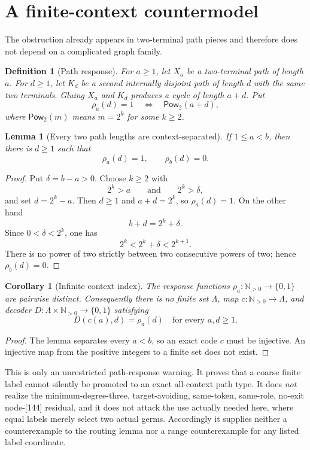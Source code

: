 \documentclass[11pt]{article}
\newtheorem{definition}{Definition}
\newtheorem{lemma}{Lemma}
\newtheorem{corollary}{Corollary}
\newcommand{\Pow}{\mathsf{Pow}_2}
\begin{document}
\section{A finite-context countermodel}

The obstruction already appears in two-terminal path pieces and therefore
does not depend on a complicated graph family.

\begin{definition}[Path response]
For $a\ge1$, let $X_a$ be a two-terminal path of length $a$.  For $d\ge1$,
let $K_d$ be a second internally disjoint path of length $d$ with the same
two terminals.  Gluing $X_a$ and $K_d$ produces a cycle of length $a+d$.
Put
\[
 \rho_a(d)=1
 \quad\Longleftrightarrow\quad
 \Pow(a+d),
\]
where $\Pow(m)$ means $m=2^k$ for some $k\ge2$.
\end{definition}

\begin{lemma}[Every two path lengths are context-separated]
If $1\le a<b$, then there is $d\ge1$ such that
\[
 \rho_a(d)=1,\qquad \rho_b(d)=0.
\]
\end{lemma}

\begin{proof}
Put $\delta=b-a>0$.  Choose $k\ge2$ with
\[
 2^k>a\qquad\text{and}\qquad 2^k>\delta,
\]
and set $d=2^k-a$.  Then $d\ge1$ and $a+d=2^k$, so
$\rho_a(d)=1$.  On the other hand
\[
 b+d=2^k+\delta.
\]
Since $0<\delta<2^k$, one has
\[
 2^k<2^k+\delta<2^{k+1}.
\]
There is no power of two strictly between two consecutive powers of two;
hence $\rho_b(d)=0$.
\end{proof}

\begin{corollary}[Infinite context index]
The response functions $\rho_a:\mathbb N_{>0}\to\{0,1\}$ are pairwise
distinct.  Consequently there is no finite set $\Lambda$, map
$c:\mathbb N_{>0}\to\Lambda$, and decoder
$D:\Lambda\times\mathbb N_{>0}\to\{0,1\}$ satisfying
\[
 D(c(a),d)=\rho_a(d)
 \quad\text{for every }a,d\ge1.
\]
\end{corollary}

\begin{proof}
The lemma separates every $a<b$, so an exact code $c$ must be injective.
An injective map from the positive integers to a finite set does not exist.
\end{proof}

This is only an unrestricted path-response warning.  It proves that a coarse
finite label cannot silently be promoted to an exact all-context path type.
It does \emph{not} realize the minimum-degree-three, target-avoiding,
same-token, same-role, no-exit node-[144] residual, and it does not attack the
use actually needed here, where equal labels merely select two actual germs.
Accordingly it supplies neither a counterexample to the routing lemma nor a
range counterexample for any listed label coordinate.
\end{document}
